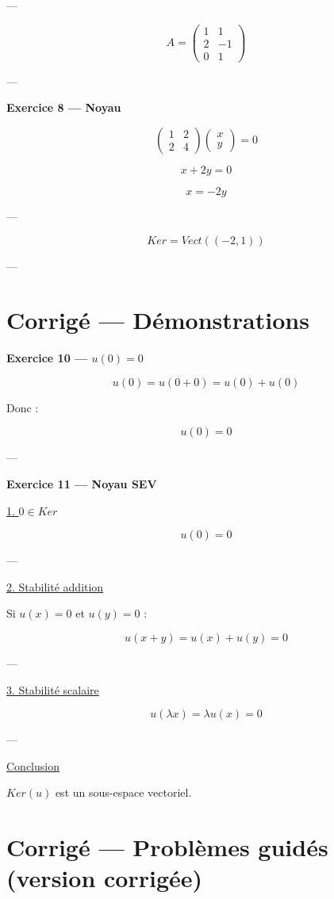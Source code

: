\documentclass[11pt,a4paper]{article}
\begin{document}
---

\[
A =
\begin{pmatrix}
1 & 1 \\
2 & -1 \\
0 & 1
\end{pmatrix}
\]

---

\textbf{Exercice 8 — Noyau}

\[
\begin{pmatrix}
1 & 2 \\
2 & 4
\end{pmatrix}
\begin{pmatrix}x\\y\end{pmatrix} = 0
\]

\[
x+2y=0
\]

\[
x=-2y
\]

---

\[
Ker = Vect((-2,1))
\]

---

\section{Corrigé — Démonstrations}

\textbf{Exercice 10 — $u(0)=0$}

\[
u(0) = u(0+0) = u(0)+u(0)
\]

Donc :

\[
u(0)=0
\]

---

\textbf{Exercice 11 — Noyau SEV}

\underline{1. $0 \in Ker$}

\[
u(0)=0
\]

---

\underline{2. Stabilité addition}

Si $u(x)=0$ et $u(y)=0$ :

\[
u(x+y)=u(x)+u(y)=0
\]

---

\underline{3. Stabilité scalaire}

\[
u(\lambda x)=\lambda u(x)=0
\]

---

\underline{Conclusion}

$Ker(u)$ est un sous-espace vectoriel.
\section{Corrigé — Problèmes guidés (version corrigée)}
\end{document}
